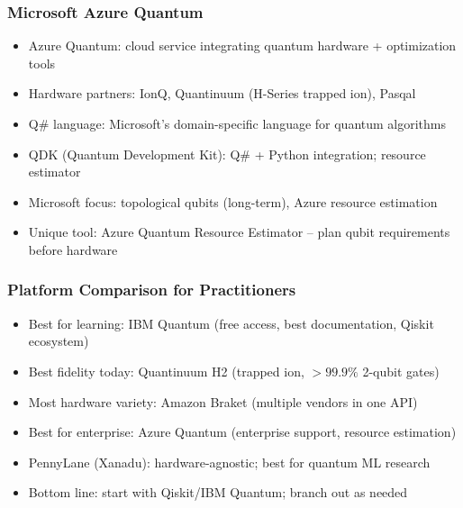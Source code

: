 \begin{frame}[fragile]\frametitle{Microsoft Azure Quantum}
\begin{itemize}
\item Azure Quantum: cloud service integrating quantum hardware + optimization tools
\item Hardware partners: IonQ, Quantinuum (H-Series trapped ion), Pasqal
\item Q\# language: Microsoft's domain-specific language for quantum algorithms
\item QDK (Quantum Development Kit): Q\# + Python integration; resource estimator
\item Microsoft focus: topological qubits (long-term), Azure resource estimation
\item Unique tool: Azure Quantum Resource Estimator -- plan qubit requirements before hardware
\end{itemize}
\end{frame}

\begin{frame}[fragile]\frametitle{Platform Comparison for Practitioners}
\begin{itemize}
\item Best for learning: IBM Quantum (free access, best documentation, Qiskit ecosystem)
\item Best fidelity today: Quantinuum H2 (trapped ion, $> 99.9\%$ 2-qubit gates)
\item Most hardware variety: Amazon Braket (multiple vendors in one API)
\item Best for enterprise: Azure Quantum (enterprise support, resource estimation)
\item PennyLane (Xanadu): hardware-agnostic; best for quantum ML research
\item Bottom line: start with Qiskit/IBM Quantum; branch out as needed
\end{itemize}
\end{frame}

